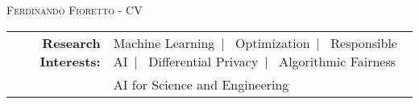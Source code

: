 \documentclass[localFont,alternative]{documentMETADATA}
\begin{document}
\makecvheader\sloppy\allowdisplaybreaks

	\makecvfooter
		{\textsc{}} %
		{\textsc{Ferdinando Fioretto - CV}}
		{\thepage}


	\begin{tabular}{r l} 
	{\bf Research Interests:} &
	{Machine Learning}~|~
	{Optimization}~|~
	{Responsible AI}~|~
	{Differential Privacy}~|~
	{Algorithmic Fairness}\\
	&{AI for Science and Engineering}
	\end{tabular}



\setlength{\LTleft}{-0pt}
		 
\setlength{\LTleft}{-20pt}
	
\setlength{\LTleft}{-0pt}
	
	
	 
	          
	
	
\end{document}
